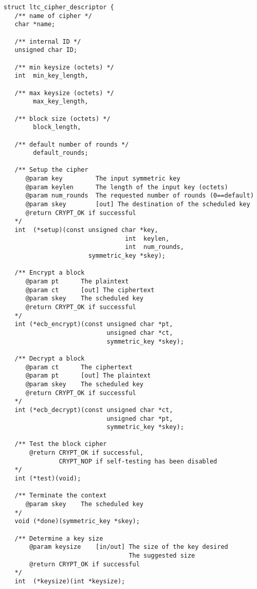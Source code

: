 \documentclass[synpaper]{book}
\begin{document}
\label{sec:cipherdesc}
\begin{small}
\begin{verbatim}
struct ltc_cipher_descriptor {
   /** name of cipher */
   char *name;

   /** internal ID */
   unsigned char ID;

   /** min keysize (octets) */
   int  min_key_length,

   /** max keysize (octets) */
        max_key_length,

   /** block size (octets) */
        block_length,

   /** default number of rounds */
        default_rounds;

   /** Setup the cipher
      @param key         The input symmetric key
      @param keylen      The length of the input key (octets)
      @param num_rounds  The requested number of rounds (0==default)
      @param skey        [out] The destination of the scheduled key
      @return CRYPT_OK if successful
   */
   int  (*setup)(const unsigned char *key,
                                 int  keylen,
                                 int  num_rounds,
                       symmetric_key *skey);

   /** Encrypt a block
      @param pt      The plaintext
      @param ct      [out] The ciphertext
      @param skey    The scheduled key
      @return CRYPT_OK if successful
   */
   int (*ecb_encrypt)(const unsigned char *pt,
                            unsigned char *ct,
                            symmetric_key *skey);

   /** Decrypt a block
      @param ct      The ciphertext
      @param pt      [out] The plaintext
      @param skey    The scheduled key
      @return CRYPT_OK if successful
   */
   int (*ecb_decrypt)(const unsigned char *ct,
                            unsigned char *pt,
                            symmetric_key *skey);

   /** Test the block cipher
       @return CRYPT_OK if successful,
               CRYPT_NOP if self-testing has been disabled
   */
   int (*test)(void);

   /** Terminate the context
      @param skey    The scheduled key
   */
   void (*done)(symmetric_key *skey);

   /** Determine a key size
       @param keysize    [in/out] The size of the key desired
                                  The suggested size
       @return CRYPT_OK if successful
   */
   int  (*keysize)(int *keysize);


\end{verbatim}
\end{small}
\end{document}
